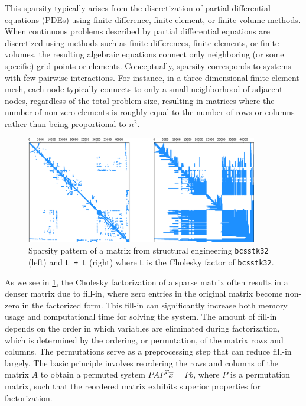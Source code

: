  This sparsity typically arises from the discretization of partial differential equations (PDEs)\cite{schaeffer_sparse_2013} using finite difference, finite element, or finite volume methods. When continuous problems described by partial differential equations are discretized using methods such as finite differences, finite elements, or finite volumes, the resulting algebraic equations connect only neighboring (or some specific) grid points or elements. Conceptually, sparsity corresponds to systems with few pairwise interactions. For instance, in a three-dimensional finite element mesh, each node typically connects to only a small neighborhood of adjacent nodes, regardless of the total problem size, resulting in matrices where the number of non-zero elements is roughly equal to the number of rows or columns rather than being proportional to $n^2$. 


\begin{figure}[!h]
    \centering
    \includegraphics[width=0.9\textwidth]{fig/intro/sparsity_pattern.png}
    \caption{Sparsity pattern of a matrix from structural engineering \texttt{bcsstk32} (left) and \texttt{L + L} (right) where \texttt{L} is the Cholesky factor of \texttt{bcsstk32}.}
    \label{fig:sparse-matrix-example}
\end{figure}

As we see in \cref{fig:sparse-matrix-example}, the Cholesky factorization of a sparse matrix often results in a denser matrix due to fill-in, where zero entries in the original matrix become non-zero in the factorized form. This fill-in can significantly increase both memory usage and computational time for solving the system. The amount of fill-in depends on the order in which variables are eliminated during factorization, which is determined by the ordering, or permutation, of the matrix rows and columns. The permutations serve as a preprocessing step that can reduce fill-in largely. The basic principle involves reordering the rows and columns of the matrix $A$ to obtain a permuted system $PAP^T \hat{x} = Pb$, where $P$ is a permutation matrix, such that the reordered matrix exhibits superior properties for factorization. 

